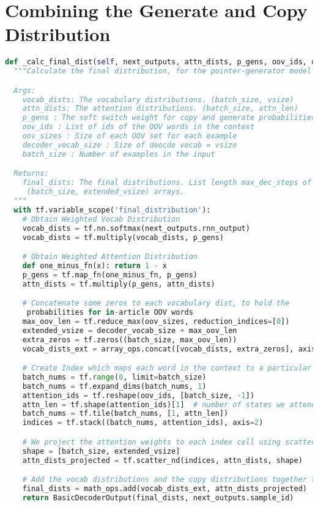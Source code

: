 \section{Combining the Generate and Copy Distribution}
\label{code:dists}
\begin{lstlisting}[language=Python]
def _calc_final_dist(self, next_outputs, attn_dists, p_gens, oov_ids, oov_sizes, decoder_vocab_size, batch_size):
  """Calculate the final distribution, for the pointer-generator model

  Args:
    vocab_dists: The vocabulary distributions. (batch_size, vsize)
    attn_dists: The attention distributions. (batch_size, attn_len)
    p_gens : The soft switch weight for copy and generate probabilities
    oov_ids : List of ids of the OOV words in the context
    oov_sizes : Size of each OOV set for each example
    decoder_vocab_size : Size of deocde vocab = vsize
    batch_size : Number of examples in the input

  Returns:
    final_dists: The final distributions. List length max_dec_steps of 
     (batch_size, extended_vsize) arrays.
  """
  with tf.variable_scope('final_distribution'):
  	# Obtain Weighted Vocab Distribution
    vocab_dists = tf.nn.softmax(next_outputs.rnn_output)
    vocab_dists = tf.multiply(vocab_dists, p_gens)

    # Obtain Weighted Attention Distribution
    def one_minus_fn(x): return 1 - x
    p_gens = tf.map_fn(one_minus_fn, p_gens)
    attn_dists = tf.multiply(p_gens, attn_dists)

    # Concatenate some zeros to each vocabulary dist, to hold the 
     probabilities for in-article OOV words
    max_oov_len = tf.reduce_max(oov_sizes, reduction_indices=[0])
    extended_vsize = decoder_vocab_size + max_oov_len
    extra_zeros = tf.zeros((batch_size, max_oov_len))    
    vocab_dists_ext = array_ops.concat([vocab_dists, extra_zeros], axis=1)

    # Create Index which maps each word in the context to a particular cell
    batch_nums = tf.range(0, limit=batch_size) 
    batch_nums = tf.expand_dims(batch_nums, 1) 
    attention_ids = tf.reshape(oov_ids, [batch_size, -1])
    attn_len = tf.shape(attention_ids)[1]  # number of states we attend over
    batch_nums = tf.tile(batch_nums, [1, attn_len])
    indices = tf.stack((batch_nums, attention_ids), axis=2)

    # We project the attention weights to each index cell using scatter_nd
    shape = [batch_size, extended_vsize]
    attn_dists_projected = tf.scatter_nd(indices, attn_dists, shape)

    # Add the vocab distributions and the copy distributions together to get the final distributions
    final_dists = math_ops.add(vocab_dists_ext, attn_dists_projected)
    return BasicDecoderOutput(final_dists, next_outputs.sample_id)

\end{lstlisting}

